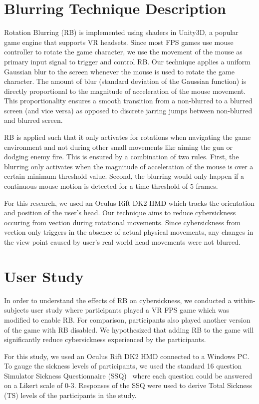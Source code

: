 \documentclass{vgtc}                          %
\begin{document}
\section{Blurring Technique Description}

Rotation Blurring (RB) is implemented using shaders in Unity3D, a popular game engine that supports VR headsets. Since most FPS games use mouse controller to rotate the game character, we use the movement of the mouse as primary input signal to trigger and control RB. Our technique applies a uniform Gaussian blur to the screen whenever the mouse is used to rotate the game character. The amount of blur (standard deviation of the Gaussian function) is directly proportional to the magnitude of acceleration of the mouse movement. This proportionality ensures a smooth transition from a non-blurred to a blurred screen (and vice versa) as opposed to discrete jarring jumps between non-blurred and blurred screen.

RB is applied such that it only activates for rotations when navigating the game environment and not during other small movements like aiming the gun or dodging enemy fire. This is ensured by a combination of two rules. First, the blurring only activates when the magnitude of acceleration of the mouse is over a certain minimum threshold value. Second, the blurring would only happen if a continuous mouse motion is detected for a time threshold of 5 frames.

For this research, we used an Oculus Rift DK2 HMD which tracks the orientation and position of the user's head. Our technique aims to reduce cybersickness occuring from vection during rotational movements. Since cybersickness from vection only triggers in the absence of actual physical movements, any changes in the view point caused by user's real world head movements were not blurred.

\section{User Study}

In order to understand the effects of RB on cybersickness, we conducted a within-subjects user study where participants played a VR FPS game which was modified to enable RB. For comparison, participants also played another version of the game with RB disabled. We hypothesized that adding RB to the game will significantly reduce cybersickness experienced by the participants. 

For this study, we used an Oculus Rift DK2 HMD connected to a Windows PC. To gauge the sickness levels of participants, we used the standard 16 question Simulator Sickness Questionnaire (SSQ)~\cite{kennedy1993simulator} where each question could be answered on a Likert scale of 0-3. Responses of the SSQ were used to derive Total Sickness (TS) levels of the participants in the study.
\end{document}
